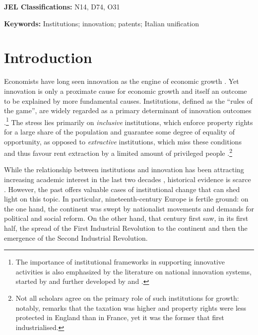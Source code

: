 \bigskip
\textbf{JEL Classifications:} N14, D74, O31 %

\textbf{Keywords:} Institutions; innovation; patents; Italian unification


\clearpage

\section{Introduction}

\noindent Economists have long seen innovation as the engine of economic growth \citep{schumpeter1942, solow1957}. 
Yet innovation is only a proximate cause for economic growth and itself an outcome to be explained by more fundamental causes. 
Institutions, defined as the “rules of the game”, are widely regarded as a primary determinant of innovation outcomes \citep{north1973, north1990, acemoglu2005}.\footnote{The importance of institutional frameworks in supporting innovative activities is also emphasized by the literature on national innovation systems, started by \citet{freeman1987} and further developed by \citet{lundvall1992} and \citet{nelson1993}.
}  
The stress lies primarily on \textit{inclusive} institutions, which enforce property rights for a large share of the population and guarantee some degree of equality of opportunity, as opposed to \textit{extractive} institutions, which miss these conditions and thus favour rent extraction by a limited amount of privileged people \citep{acemoglu2001, acemoglu2012}.\footnote{Not all scholars agree on the primary role of such institutions for growth: notably, \citet[][pp. 28-29]{allen2011} remarks that the taxation was higher and property rights were less protected in England than in France, yet it was the former that first industrialised.
}

While the relationship between institutions and innovation has been attracting increasing academic interest in the last two decades \citep[see][Figure 1]{he2020}, historical evidence is scarce \citep{donges2022}.
However, the past offers valuable cases of institutional change that can shed light on this topic. 
In particular, nineteenth-century Europe is fertile ground: on the one hand, the continent was swept by nationalist movements and demands for political and social reform. 
On the other hand, that century first saw, in its first half, the spread of the First Industrial Revolution to the continent and then the emergence of the Second Industrial Revolution. 

